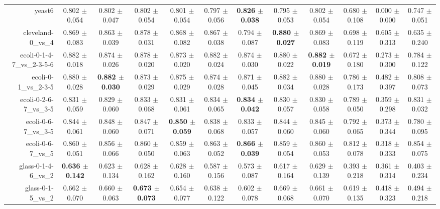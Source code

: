 \begin{table}[!ht]
{\begin{tabular}{r c c c c c c c c c c c}
yeast6 & 0.802 $\pm$ 0.054 & 0.802 $\pm$ 0.047 & 0.802 $\pm$ 0.054 & 0.801 $\pm$ 0.054 & 0.797 $\pm$ 0.056 & \textbf{0.826 $\pm$ 0.038} & 0.795 $\pm$ 0.053 & 0.802 $\pm$ 0.054 & 0.680 $\pm$ 0.108 & 0.000 $\pm$ 0.000 & 0.747 $\pm$ 0.051 \\
cleveland-0\_vs\_4 & 0.869 $\pm$ 0.083 & 0.863 $\pm$ 0.039 & 0.878 $\pm$ 0.031 & 0.868 $\pm$ 0.082 & 0.867 $\pm$ 0.038 & 0.794 $\pm$ 0.087 & \textbf{0.880 $\pm$ 0.027} & 0.869 $\pm$ 0.083 & 0.698 $\pm$ 0.119 & 0.605 $\pm$ 0.313 & 0.635 $\pm$ 0.240 \\
ecoli-0-1-4-7\_vs\_2-3-5-6 & 0.882 $\pm$ 0.018 & 0.874 $\pm$ 0.026 & 0.878 $\pm$ 0.020 & 0.873 $\pm$ 0.020 & 0.882 $\pm$ 0.024 & 0.874 $\pm$ 0.030 & 0.880 $\pm$ 0.022 & \textbf{0.882 $\pm$ 0.019} & 0.672 $\pm$ 0.180 & 0.273 $\pm$ 0.300 & 0.784 $\pm$ 0.122 \\
ecoli-0-1\_vs\_2-3-5 & 0.880 $\pm$ 0.028 & \textbf{0.882 $\pm$ 0.030} & 0.873 $\pm$ 0.029 & 0.875 $\pm$ 0.029 & 0.874 $\pm$ 0.028 & 0.871 $\pm$ 0.045 & 0.882 $\pm$ 0.034 & 0.880 $\pm$ 0.028 & 0.786 $\pm$ 0.173 & 0.482 $\pm$ 0.397 & 0.808 $\pm$ 0.073 \\
ecoli-0-2-6-7\_vs\_3-5 & 0.831 $\pm$ 0.059 & 0.829 $\pm$ 0.060 & 0.833 $\pm$ 0.068 & 0.831 $\pm$ 0.061 & 0.834 $\pm$ 0.065 & \textbf{0.834 $\pm$ 0.042} & 0.830 $\pm$ 0.057 & 0.830 $\pm$ 0.058 & 0.789 $\pm$ 0.050 & 0.359 $\pm$ 0.298 & 0.831 $\pm$ 0.032 \\
ecoli-0-6-7\_vs\_3-5 & 0.844 $\pm$ 0.061 & 0.848 $\pm$ 0.060 & 0.847 $\pm$ 0.071 & \textbf{0.850 $\pm$ 0.059} & 0.838 $\pm$ 0.068 & 0.833 $\pm$ 0.057 & 0.844 $\pm$ 0.060 & 0.845 $\pm$ 0.060 & 0.792 $\pm$ 0.065 & 0.373 $\pm$ 0.344 & 0.780 $\pm$ 0.095 \\
ecoli-0-6-7\_vs\_5 & 0.860 $\pm$ 0.051 & 0.856 $\pm$ 0.066 & 0.860 $\pm$ 0.050 & 0.859 $\pm$ 0.063 & 0.863 $\pm$ 0.052 & \textbf{0.866 $\pm$ 0.039} & 0.859 $\pm$ 0.054 & 0.860 $\pm$ 0.053 & 0.812 $\pm$ 0.078 & 0.318 $\pm$ 0.333 & 0.854 $\pm$ 0.075 \\
glass-0-1-4-6\_vs\_2 & \textbf{0.636 $\pm$ 0.142} & 0.623 $\pm$ 0.134 & 0.628 $\pm$ 0.162 & 0.628 $\pm$ 0.160 & 0.587 $\pm$ 0.156 & 0.573 $\pm$ 0.087 & 0.617 $\pm$ 0.164 & 0.629 $\pm$ 0.139 & 0.393 $\pm$ 0.218 & 0.361 $\pm$ 0.314 & 0.403 $\pm$ 0.234 \\
glass-0-1-5\_vs\_2 & 0.662 $\pm$ 0.070 & 0.660 $\pm$ 0.063 & \textbf{0.673 $\pm$ 0.073} & 0.654 $\pm$ 0.077 & 0.638 $\pm$ 0.122 & 0.602 $\pm$ 0.078 & 0.669 $\pm$ 0.068 & 0.661 $\pm$ 0.070 & 0.619 $\pm$ 0.135 & 0.418 $\pm$ 0.323 & 0.494 $\pm$ 0.218 \\

\end{tabular}}
\end{table}
